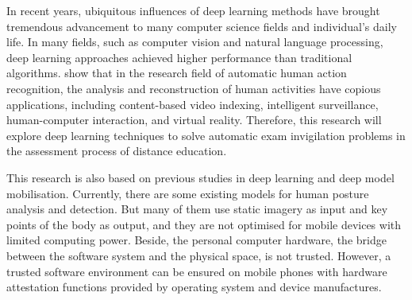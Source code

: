 In recent years, ubiquitous influences of deep learning methods have brought tremendous advancement to many computer science fields and individual's daily life. 
In many fields, such as computer vision and natural language processing, deep learning approaches achieved higher performance than traditional algorithms.
\citet{mccay2020abnormal} show that in the research field of automatic human action recognition, the analysis and reconstruction of human activities have copious applications, including content-based video indexing, intelligent surveillance, human-computer interaction, and virtual reality.
Therefore, this research will explore deep learning techniques to solve automatic exam invigilation problems in the assessment process of distance education.


This research is also based on previous studies in deep learning and deep model mobilisation.
Currently, there are some existing models for human posture analysis and detection.
But many of them use static imagery as input and key points of the body as output, and they are not optimised for mobile devices with limited computing power.
Beside, the personal computer hardware, the bridge between the software system and the physical space, is not trusted.
However, a trusted software environment can be ensured on mobile phones with hardware attestation functions provided by operating system and device manufactures.

